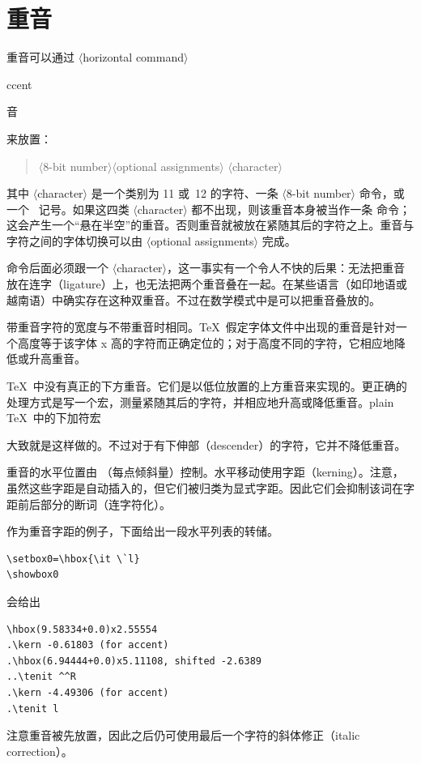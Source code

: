 \documentclass[a4paper]{rapport3}
\makeatletter
\def\gr#1{$\langle$#1$\rangle$}\def\key#1{{\tt#1}}
\newenvironment{disp}{\begin{quotation}}{\end{quotation}}
\def\term#1\par{\index{#1}}
\def\cstoidx#1\par{\index{#1@\cs{#1}}}
\makeatother
\begin{document}
\section{重音}

重音可以通过 \gr{horizontal command}~\cstoidx accent\par\term 重音\par
\label{character} 来放置：
\begin{disp}\gr{8-bit number}\gr{optional assignments}%
     \gr{character}\end{disp}
其中 \gr{character} 是一个类别为 11 或~12 的字符、一条 \gr{8-bit number} 命令，或一个~ 记号。如果这四类 \gr{character} 都不出现，则该重音本身被当作一条  命令；这会产生一个“悬在半空”的重音。否则重音就被放在紧随其后的字符之上。重音与字符之间的字体切换可以由 \gr{optional assignments} 完成。

 命令后面必须跟一个 \gr{character}，这一事实有一个令人不快的后果：无法把重音放在连字（ligature）上，也无法把两个重音叠在一起。在某些语言（如印地语或越南语）中确实存在这种双重音。不过在数学模式中是可以把重音叠放的。

带重音字符的宽度与不带重音时相同。\TeX\ 假定字体文件中出现的重音是针对一个高度等于该字体 x 高的字符而正确定位的；对于高度不同的字符，它相应地降低或升高重音。

\TeX\ 中没有真正的下方重音。它们是以低位放置的上方重音来实现的。更正确的处理方式是写一个宏，测量紧随其后的字符，并相应地升高或降低重音。plain \TeX\ 中的下加符宏 \cstoidx c\par 大致就是这样做的。不过对于有下伸部（descender）的字符，它并不降低重音。

重音的水平位置由 （每点倾斜量）控制。水平移动使用字距（kerning）。注意，虽然这些字距是自动插入的，但它们被归类为{\italic 显式\/}字距。因此它们会抑制该词在字距前后部分的断词（连字符化）。

作为重音字距的例子，下面给出一段水平列表的转储。
\begin{verbatim}
\setbox0=\hbox{\it \`l}
\showbox0
\end{verbatim}
会给出
\begin{verbatim}
\hbox(9.58334+0.0)x2.55554
.\kern -0.61803 (for accent)
.\hbox(6.94444+0.0)x5.11108, shifted -2.6389
..\tenit ^^R
.\kern -4.49306 (for accent)
.\tenit l
\end{verbatim}
注意重音被先放置，因此之后仍可使用最后一个字符的斜体修正（italic correction）。
\awp
\end{document}
